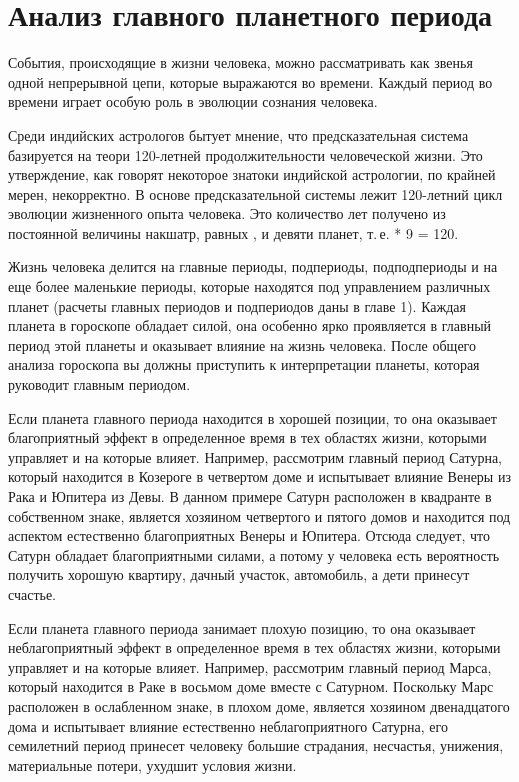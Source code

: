 \section{Анализ главного планетного периода}

События, происходящие в жизни человека, можно рассматривать как звенья одной непрерывной цепи, которые выражаются во времени. Каждый период во времени играет особую роль в эволюции сознания человека.

Среди индийских астрологов бытует мнение, что предсказательная система базируется на теори 120-летней продолжительности человеческой жизни. Это утверждение, как говорят некоторое знатоки индийской астрологии, по крайней мерен, некорректно. В основе предсказательной системы лежит 120-летний цикл эволюции жизненного опыта человека. Это количество лет получено из постоянной величины накшатр, равных , и девяти планет, т.\,е.  * 9 = 120.

Жизнь человека делится на главные периоды, подпериоды, подподпериоды и на еще более маленькие периоды, которые находятся под управлением различных планет (расчеты главных периодов и подпериодов даны в главе 1). Каждая планета в гороскопе обладает силой, она особенно ярко проявляется в главный период этой планеты и оказывает влияние на жизнь человека. После общего анализа гороскопа вы должны приступить к интерпретации планеты, которая руководит главным периодом.

Если планета главного периода находится в хорошей позиции, то она оказывает благоприятный эффект в определенное время в тех областях жизни, которыми управляет и на которые влияет. Например, рассмотрим главный период Сатурна, который находится в Козероге в четвертом доме и испытывает влияние Венеры из Рака и Юпитера из Девы. В данном примере Сатурн расположен в квадранте в собственном знаке, является хозяином четвертого и пятого домов и находится под аспектом естественно благоприятных Венеры и Юпитера. Отсюда следует, что Сатурн обладает благоприятными силами, а потому у человека есть вероятность получить хорошую квартиру, дачный участок, автомобиль, а дети принесут счастье.

Если планета главного периода занимает плохую позицию, то она оказывает неблагоприятный эффект в определенное время в тех областях жизни, которыми управляет и на которые влияет. Например, рассмотрим главный период Марса, который находится в Раке в восьмом доме вместе с Сатурном. Поскольку Марс расположен в ослабленном знаке, в плохом доме, является хозяином двенадцатого дома и испытывает влияние естественно неблагоприятного Сатурна, его семилетний период принесет человеку большие страдания, несчастья, унижения, материальные потери, ухудшит условия жизни.

